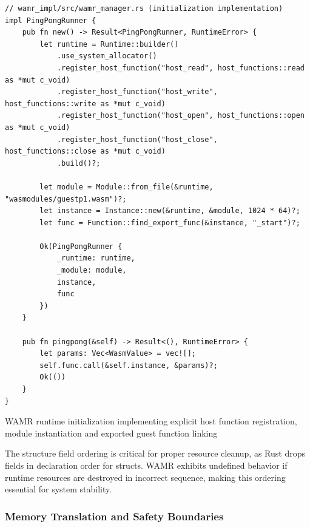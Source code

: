 \begin{listing}[H]
\begin{verbatim}
// wamr_impl/src/wamr_manager.rs (initialization implementation)
impl PingPongRunner {
    pub fn new() -> Result<PingPongRunner, RuntimeError> {
        let runtime = Runtime::builder()
            .use_system_allocator()
            .register_host_function("host_read", host_functions::read as *mut c_void)
            .register_host_function("host_write", host_functions::write as *mut c_void)
            .register_host_function("host_open", host_functions::open as *mut c_void)
            .register_host_function("host_close", host_functions::close as *mut c_void)
            .build()?;

        let module = Module::from_file(&runtime, "wasmodules/guestp1.wasm")?;
        let instance = Instance::new(&runtime, &module, 1024 * 64)?;
        let func = Function::find_export_func(&instance, "_start")?;
        
        Ok(PingPongRunner { 
            _runtime: runtime, 
            _module: module, 
            instance, 
            func 
        })
    }

    pub fn pingpong(&self) -> Result<(), RuntimeError> {
        let params: Vec<WasmValue> = vec![];
        self.func.call(&self.instance, &params)?;
        Ok(())
    }
}
\end{verbatim}
\caption{WAMR runtime initialization implementing explicit host function registration, module instantiation and exported guest function linking}
\label{lst:wamr-initialization}
\end{listing}

The structure field ordering is critical for proper resource cleanup, as Rust drops fields in declaration order for structs. WAMR exhibits undefined behavior if runtime resources are destroyed in incorrect sequence, making this ordering essential for system stability.

\subsubsection{Memory Translation and Safety Boundaries}

